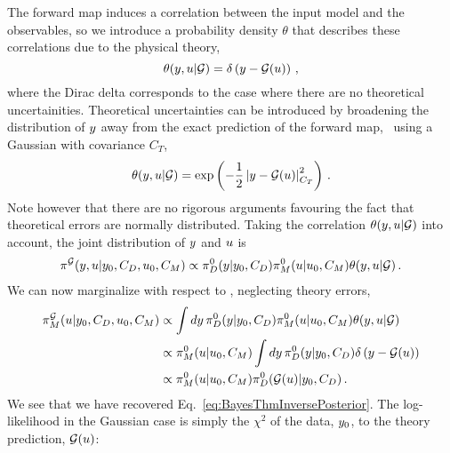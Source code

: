The forward map induces a correlation between the input model and the
observables, so we introduce a probability density $\theta$ that describes these
correlations due to the physical theory,  
\begin{equation}
  \label{eq:ThetaCorr}
  \theta(y,u|\mathcal{G}) = \delta\left(y - \mathcal{G}(u)\right)\, ,
\end{equation}
where the Dirac delta corresponds to the case where there are no theoretical
uncertainities. Theoretical uncertainties can be introduced by broadening the
distribution of $y$ away from the exact prediction of the forward map, \eg\
using a Gaussian with covariance $C_T$,
\begin{equation}
  \label{eq:TheoryErrors}
  \theta(y,u|\mathcal{G}) = \exp\left(
    -\frac12 
    \left| y - \mathcal{G}(u)
    \right|_{C_T}^2\right)\, .
\end{equation}
Note however that there are no rigorous arguments favouring the fact that
theoretical errors are normally distributed. Taking the correlation
$\theta(y,u|\mathcal{G})$ into account, the joint distribution of
$y$ and $u$ is
\begin{align}
  \label{eq:JointYAndU}
  \pi^{\mathcal{G}}(y,u|y_0,C_{D},u_0,C_M) 
  \propto 
  \pi_{D}^0(y|y_0,C_{D}) 
  \pi_{M}^0(u|u_0, C_M) 
  \theta(y,u|\mathcal{G})\, .
\end{align}
We can now marginalize with respect to \obs, neglecting theory errors, 
\begin{align}
  \label{eq:MarginOne}
  \pi^{\mathcal{G}}_M(u|y_0,C_{D},u_0,C_M) 
  &\propto \int dy\, \pi_{D}^0(y|y_0,C_{D}) 
    \pi_{M}^0(u|u_0,C_M) 
    \theta(y,u|\mathcal{G}) \\
  & \propto \pi_{M}^0(u|u_0,C_M)  
    \int dy\, \pi_{D}^0(y|y_0,C_{D}) 
    \delta\left(y-\mathcal{G}(u)\right) \\
  & \propto \pi_{M}^0(u|u_0,C_M) 
    \pi_{D}^0(\mathcal{G}(u)|y_0,C_{D})\, .
\end{align}
We see that we have recovered Eq.~\ref{eq:BayesThmInversePosterior}. The
log-likelihood in the Gaussian case is simply the $\chi^2$ of the data,
$y_0$, to the theory prediction, $\mathcal{G}(u)$:
